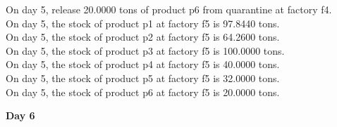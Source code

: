 \begin{tabbing}
On day 5, release 20.0000 tons of product p6 from quarantine at factory f4. \\
On day 5, the stock of product p1 at factory f5 is 97.8440 tons. \\
On day 5, the stock of product p2 at factory f5 is 64.2600 tons. \\
On day 5, the stock of product p3 at factory f5 is 100.0000 tons. \\
On day 5, the stock of product p4 at factory f5 is 40.0000 tons. \\
On day 5, the stock of product p5 at factory f5 is 32.0000 tons. \\
On day 5, the stock of product p6 at factory f5 is 20.0000 tons. \\
\end{tabbing} \vspace{-2.0em}
\textbf{Day 6}
\vspace{-1.6em}
